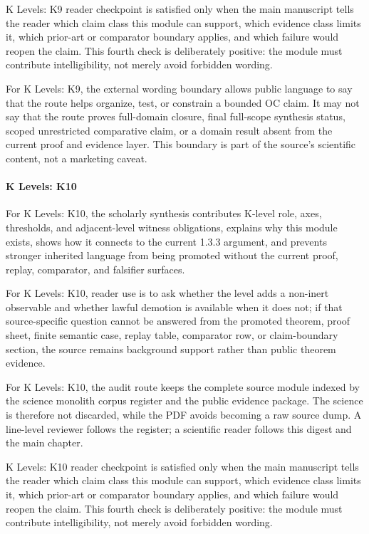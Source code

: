 K Levels: K9 reader checkpoint is satisfied only when the main manuscript tells the reader which claim class this module can support, which evidence class limits it, which prior-art or comparator boundary applies, and which failure would reopen the claim. This fourth check is deliberately positive: the module must contribute intelligibility, not merely avoid forbidden wording.


For K Levels: K9, the external wording boundary allows public language to say that the route helps organize, test, or constrain a bounded OC claim. It may not say that the route proves full-domain closure, final full-scope synthesis status, scoped unrestricted comparative claim, or a domain result absent from the current proof and evidence layer. This boundary is part of the source's scientific content, not a marketing caveat.


\paragraph{K Levels: K10}

For K Levels: K10, the scholarly synthesis contributes K-level role, axes, thresholds, and adjacent-level witness obligations, explains why this module exists, shows how it connects to the current 1.3.3 argument, and prevents stronger inherited language from being promoted without the current proof, replay, comparator, and falsifier surfaces.


For K Levels: K10, reader use is to ask whether the level adds a non-inert observable and whether lawful demotion is available when it does not; if that source-specific question cannot be answered from the promoted theorem, proof sheet, finite semantic case, replay table, comparator row, or claim-boundary section, the source remains background support rather than public theorem evidence.


For K Levels: K10, the audit route keeps the complete source module indexed by the science monolith corpus register and the public evidence package. The science is therefore not discarded, while the PDF avoids becoming a raw source dump. A line-level reviewer follows the register; a scientific reader follows this digest and the main chapter.


K Levels: K10 reader checkpoint is satisfied only when the main manuscript tells the reader which claim class this module can support, which evidence class limits it, which prior-art or comparator boundary applies, and which failure would reopen the claim. This fourth check is deliberately positive: the module must contribute intelligibility, not merely avoid forbidden wording.


